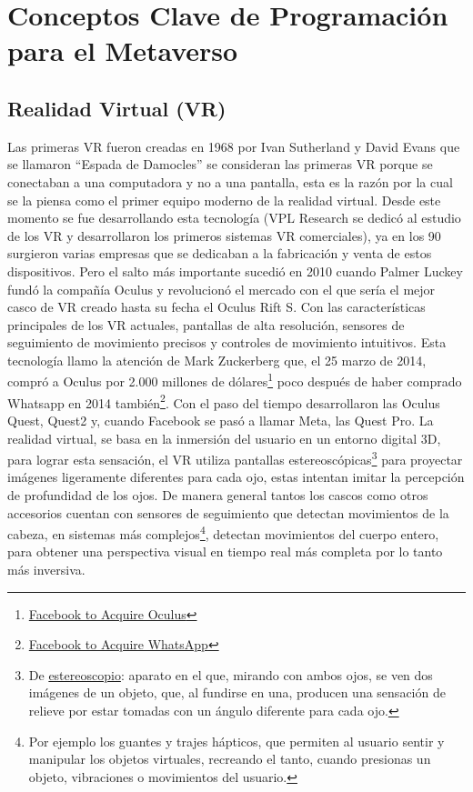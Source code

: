 \documentclass[a4paper,10pt]{article}
\begin{document}
	\section{Conceptos Clave de Programación para el Metaverso}
	 
	\subsection{Realidad Virtual (VR)}
	Las primeras VR fueron creadas en 1968 por Ivan Sutherland  y David Evans que se llamaron “Espada de Damocles” se consideran las primeras VR porque se conectaban a una computadora y no a una pantalla, esta es la razón por la cual se la piensa como el primer equipo moderno de la realidad virtual. Desde este momento se fue desarrollando esta tecnología (VPL Research se dedicó al estudio de los VR y desarrollaron los primeros sistemas VR comerciales), ya en los 90 surgieron varias empresas que se dedicaban a la fabricación y venta de estos dispositivos. Pero el salto más importante sucedió en 2010 cuando Palmer Luckey fundó la compañía Oculus y revolucionó el mercado con el que sería el mejor casco de VR creado hasta su fecha el Oculus Rift S. Con las características principales de los VR actuales, pantallas de alta resolución, sensores de seguimiento de movimiento precisos y controles de movimiento intuitivos. Esta tecnología llamo la atención de Mark Zuckerberg que, el 25 marzo de 2014, compró a Oculus por 2.000 millones de dólares\footnote{\href{https://about.fb.com/news/2014/03/facebook-to-acquire-oculus/}{Facebook to Acquire Oculus}}
	poco después de haber comprado Whatsapp en 2014 también\footnote{\href{https://about.fb.com/news/2014/02/facebook-to-acquire-whatsapp/}{Facebook to Acquire WhatsApp}}. 
	Con el paso del tiempo desarrollaron las Oculus Quest, Quest2 y, cuando Facebook se pasó a llamar Meta, las Quest Pro. La realidad virtual, se basa en la inmersión del usuario en un entorno digital 3D, para lograr esta sensación, el VR utiliza pantallas estereoscópicas\footnote{De \href{https://dle.rae.es/estereoscopio}{estereoscopio}: aparato en el que, mirando con ambos ojos, se ven dos imágenes de un objeto, que, al fundirse en una, producen una sensación de relieve por estar tomadas con un ángulo diferente para cada ojo.} 
	para proyectar imágenes ligeramente diferentes para cada ojo, estas intentan imitar la percepción de profundidad de los ojos. De manera general tantos los cascos como otros accesorios cuentan con sensores de seguimiento que detectan movimientos de la cabeza, en sistemas más complejos\footnote{Por ejemplo los guantes y trajes hápticos, que permiten al usuario sentir y manipular los objetos virtuales, recreando el tanto, cuando presionas un objeto, vibraciones o movimientos del usuario.}, 
	detectan movimientos del cuerpo entero, para obtener una perspectiva visual en tiempo real más completa por lo tanto más inversiva.
\end{document}
